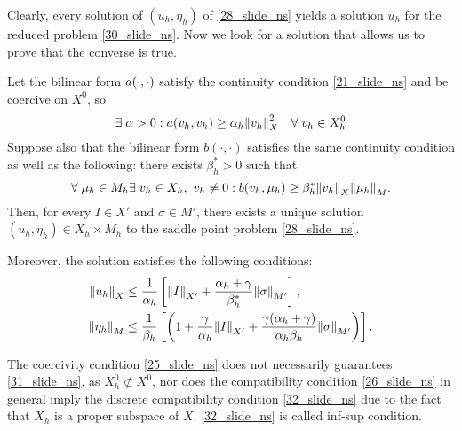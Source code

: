 Clearly, every solution of \((u_h, \eta_h)\) of \eqref{28_slide_ns} yields a solution \(u_h\) for the reduced problem \eqref{30_slide_ns}. Now we look for a solution that allows us to prove that the converse is true.
\begin{theorem}
    Let the bilinear form \(a(\cdot, \cdot)\) satisfy the continuity condition \eqref{21_slide_ns} and be coercive on \(X^0\), so 
    \begin{equation}
        \exists \; \alpha > 0 : a(v_h,v_h) \geq \alpha_h \norm{v_h}_X^2 \quad \forall \; v_h \in X^0_h
        \label{31_slide_ns}
    \end{equation}
    Suppose also that the bilinear form \(b(\cdot,\cdot)\) satisfies the same continuity condition as well as the following: there exists \(\beta_h^* > 0\) such that 
    \begin{equation}
        \forall \; \mu_h \in M_h \exists \; v_h \in X_h, \ v_h\neq 0 : b(v_h,\mu_h) \geq \beta_h^*\norm{v_h}_X\norm{\mu_h}_M.
        \label{32_slide_ns}
    \end{equation}
    Then, for every \(I \in X'\) and \(\sigma \in M'\), there exists a unique solution \((u_h,\eta_h)\in X_h \times M_h\) to the saddle point problem \eqref{28_slide_ns}.

    Moreover, the solution satisfies the following conditions:
    \begin{align}
        \norm{u_h}_X &\leq \frac{1}{\alpha_h} \left[ \norm{I}_{X'} + \frac{\alpha_h + \gamma}{\beta_h^*} \norm{\sigma}_{M'} \right], \label{33_slide_ns}\\
        \norm{\eta_h}_M &\leq \frac{1}{\beta_h} \left[ \left( 1+\frac{\gamma}{\alpha_h} \norm{I}_{X'}+ \frac{\gamma(\alpha_h+\gamma)}{\alpha_h \beta_h} \norm{\sigma}_{M'} \right) \right]. \label{34_slide_ns}
    \end{align}
    \label{uniqueness_discrete}
\end{theorem}
The coercivity condition \eqref{25_slide_ns} does not necessarily guarantees \eqref{31_slide_ns}, as \(X_h^0 \not\subset X^0\), nor does the compatibility condition \eqref{26_slide_ns} in general imply the discrete compatibility condition \eqref{32_slide_ns} due to the fact that \(X_h\) is a proper subspace of \(X\). \eqref{32_slide_ns} is called inf-sup condition.

